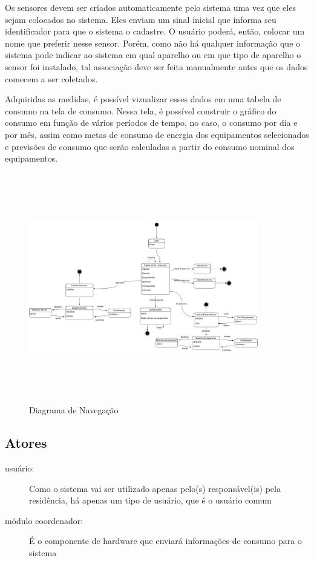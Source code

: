 Os sensores devem ser criados automaticamente pelo sistema uma vez que eles sejam colocados no sistema. Eles enviam um sinal inicial que informa seu identificador para que o sistema o cadastre. O usuário poderá, então, colocar um nome que preferir nesse sensor. Porém, como não há qualquer informação que o sistema pode indicar ao sistema em qual aparelho ou em que tipo de aparelho o sensor foi instalado, tal associação deve ser feita manualmente antes que os dados comecem a ser coletados.

Adquiridas as medidas, é possível vizualizar esses dados em uma tabela de consumo na tela de consumo. Nessa tela, é possível construir o gráfico do consumo em função de vários períodos de tempo, no caso, o consumo por dia e por mês, assim como metas de consumo de energia dos equipamentos selecionados e previsões de consumo que serão calculadas a partir do consumo nominal dos equipamentos.

\begin{figure}[H]
\begin{center}
\includegraphics[width=10cm,height=10cm,keepaspectratio]{figuras/diagrama_navegacao.png}
\caption{\label{fig:diagrama-navegacao} Diagrama de Navegação}
\end{center}
\end{figure}
%
\subsection{Atores}
\begin{description}
	\item[usuário:] Como o sistema vai ser utilizado apenas pelo(s) responsável(is) pela residência, há apenas um tipo de usuário, que é o usuário comum
    \item[módulo coordenador:] É o componente de hardware que enviará informações de consumo para o sistema
\end{description}

%

